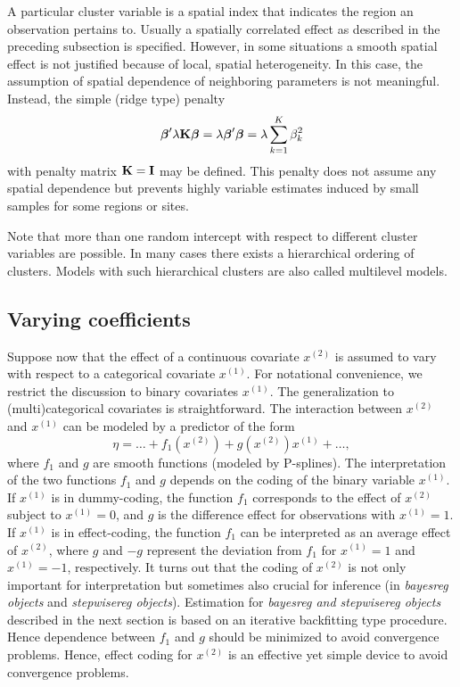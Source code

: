 \documentclass[11pt,a4paper,twoside]{bayesxarticle}
\begin{document}
A particular cluster variable is a spatial index that indicates the region an observation pertains to. Usually a spatially correlated effect
as described in the preceding subsection is specified.
However, in some situations a smooth spatial effect is not justified because of local, spatial heterogeneity. In this case,
the assumption of spatial dependence of neighboring parameters is not meaningful. Instead, the simple (ridge type) penalty
$$
\boldsymbol{\beta}' \lambda \mathbf{K} \boldsymbol{\beta} = \lambda \boldsymbol{\beta}'  \boldsymbol{\beta} = \lambda \sum_{k=1}^{K} \beta_k^2
$$
with penalty matrix $\mathbf{K} = \mathbf{I}$ may be defined. This penalty does not assume any spatial dependence but prevents highly variable
estimates induced by small samples for some regions or sites.

Note that more than one random intercept with respect to different
cluster variables are possible. In many cases there exists a
hierarchical ordering of clusters. Models with such hierarchical
clusters are also called multilevel models.


\subsection{Varying coefficients}
\label{varcoeff_terms}

Suppose now that the effect of a continuous covariate $x^{(2)}$ is assumed to vary with
respect to a categorical covariate $x^{(1)}$. For notational convenience, we restrict the discussion to binary covariates $x^{(1)}$.
The generalization to (multi)categorical covariates is straightforward.
The interaction between $x^{(2)}$ and
$x^{(1)}$ can be modeled by a predictor of the form
$$
\eta = \ldots + f_1(x^{(2)}) + g(x^{(2)}) x^{(1)} + \ldots,
$$
where $f_1$ and $g$ are smooth functions (modeled by P-splines). The
interpretation of the two functions $f_1$ and $g$ depends on the
coding of the binary variable $x^{(1)}$. If $x^{(1)}$ is in
dummy-coding, the function $f_1$ corresponds to the effect of
$x^{(2)}$ subject to  $x^{(1)}=0$, and $g$ is the difference effect
for observations with $x^{(1)}=1$. If $x^{(1)}$ is in effect-coding,
the function $f_1$ can be interpreted as an average effect of
$x^{(2)}$, where $g$ and $-g$ represent the deviation from $f_1$ for
$x^{(1)} = 1$ and $x^{(1)} = -1$, respectively. It turns out that
the coding of $x^{(2)}$ is not only important  for interpretation
but sometimes also crucial for inference (in {\em bayesreg objects}
and {\em stepwisereg objects}). Estimation for {\em bayesreg and
stepwisereg objects} described in the next section is based on an
iterative backfitting type procedure. Hence dependence between $f_1$
and $g$ should be minimized to avoid convergence problems. Hence,
effect coding for $x^{(2)}$ is an effective yet simple device to
avoid convergence problems.
\end{document}
